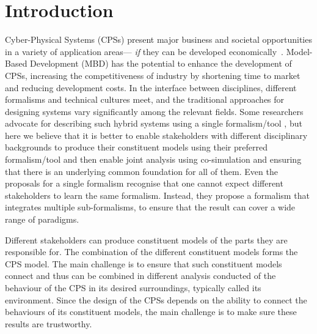 
\section{Introduction}\label{sec:intro}


Cyber-Physical Systems (CPSs) present major business and societal
opportunities in a variety of application areas--- \emph{if} they can be developed economically~\cite{Cengarle&13}. Model-Based Development (MBD) has the potential to enhance the development of CPSs, increasing the competitiveness of industry by shortening time to market and reducing development costs. In the interface between disciplines, different formalisms and technical cultures meet, and the traditional approaches for designing systems vary significantly among the relevant fields. Some researchers advocate for describing such hybrid systems using a single formalism/tool \cite{Ptolemaeus14,Platzer18}, but here we believe that it is better to enable stakeholders with different disciplinary backgrounds to produce their constituent models using their preferred formalism/tool and then enable joint analysis using co-simulation \cite{Gomes&18} and ensuring that there is an underlying common foundation for all of them.
Even the proposals for a single formalism \cite{Ptolemaeus14,Platzer18} recognise that one cannot expect different stakeholders to learn the same formalism. Instead, they propose a formalism that integrates multiple sub-formalisms, to ensure that the result can cover a wide range of paradigms.

Different stakeholders can produce constituent models of the parts they are responsible for. The combination of the different constituent models forms the CPS model.
The main challenge is to ensure that such constituent models connect and thus can be combined in different analysis conducted of the behaviour of the CPS in its desired surroundings, typically called its environment.
Since the design of the CPSs depends on the ability to connect the behaviours of its constituent models, the main challenge is to make sure these results are trustworthy.

